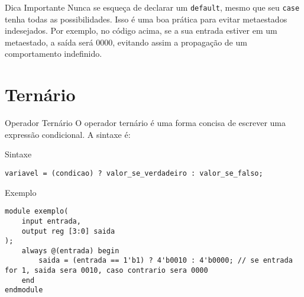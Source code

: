 \documentclass[aspectratio=169,xcolor=dvipsnames]{beamer}
\begin{document}
\begin{frame}{Dica Importante}
Nunca se esqueça de declarar um \texttt{default}, mesmo que seu \texttt{case} tenha todas as possibilidades. Isso é uma boa prática para evitar metaestados indesejados. Por exemplo, no código acima, se a sua entrada estiver em um metaestado, a saída será 0000, evitando assim a propagação de um comportamento indefinido.
\end{frame}
\section{Ternário}
\begin{frame}[fragile]{Operador Ternário}
O operador ternário é uma forma concisa de escrever uma expressão condicional. A sintaxe é:
\begin{block}{Sintaxe}
\begin{verbatim}
variavel = (condicao) ? valor_se_verdadeiro : valor_se_falso;
\end{verbatim}
\end{block}
\begin{block}{Exemplo}
\begin{verbatim}
module exemplo(
    input entrada,
    output reg [3:0] saida
);
    always @(entrada) begin
        saida = (entrada == 1'b1) ? 4'b0010 : 4'b0000; // se entrada for 1, saida sera 0010, caso contrario sera 0000
    end
endmodule
\end{verbatim}
\end{block}
\end{frame}
\end{document}
